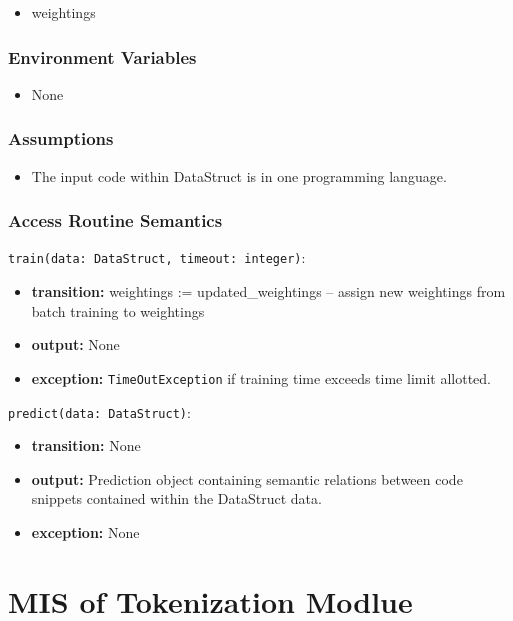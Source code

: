 \documentclass[12pt, titlepage]{article}
\begin{document}
\begin{itemize}
    \item weightings
\end{itemize}

\subsubsection{Environment Variables}

\begin{itemize}
  \item None
\end{itemize}

\subsubsection{Assumptions}

\begin{itemize}
    \item The input code within DataStruct is in one programming language.
\end{itemize}
\subsubsection{Access Routine Semantics}

\noindent \texttt{train(data: DataStruct, timeout: integer)}:
\begin{itemize}
    \item \textbf{transition:} weightings := updated\_weightings -- assign new weightings from batch training to weightings
    \item \textbf{output:} None
    \item \textbf{exception:} \texttt{TimeOutException} if training time exceeds time limit allotted. 
\end{itemize}

\noindent \texttt{predict(data: DataStruct)}:
\begin{itemize}
    \item \textbf{transition:} None
    \item \textbf{output:} Prediction object containing semantic relations between code snippets contained within the DataStruct data.
    \item \textbf{exception:} None
\end{itemize}


\section{MIS of Tokenization Modlue} \label{TokModule}
\end{document}

